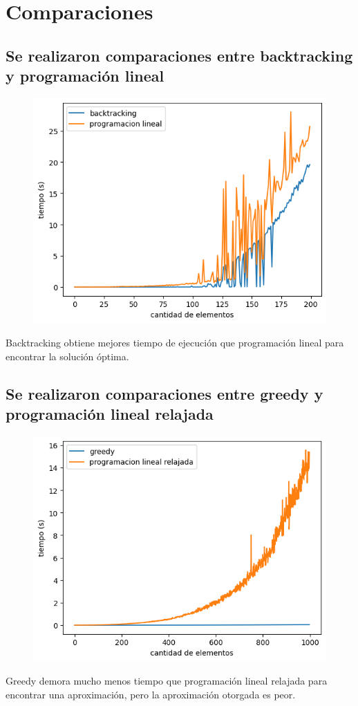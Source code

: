 \section{Comparaciones}

\subsection{Se realizaron comparaciones entre backtracking y programación lineal}

\begin{figure}[H]
    \centering
    \includegraphics[width=1\textwidth]{img/backvslp.png}
\end{figure}

Backtracking obtiene mejores tiempo de ejecución que programación lineal para encontrar la solución óptima.

\subsection{Se realizaron comparaciones entre greedy y programación lineal relajada}

\begin{figure}[H]
    \centering
    \includegraphics[width=1\textwidth]{img/greedyvslprx.png}
\end{figure}

Greedy demora mucho menos tiempo que programación lineal relajada para encontrar una aproximación, pero la aproximación otorgada es peor.